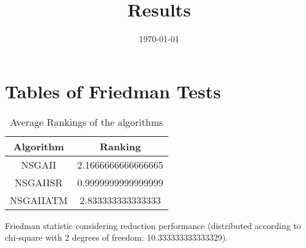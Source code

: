 \documentclass{article}
\title{Results}
\author{}
\date{\today}
\begin{document}
\oddsidemargin 0in \topmargin 0in\maketitle
\section{Tables of Friedman Tests}
\begin{table}[!htp]
\centering
\caption{Average Rankings of the algorithms
}\begin{tabular}{c|c}
Algorithm&Ranking\\
\hline
NSGAII&2.1666666666666665\\
NSGAIISR&0.9999999999999999\\
NSGAIIATM&2.833333333333333\\
\end{tabular}
\end{table}


Friedman statistic considering reduction performance (distributed according to chi-square with 2 degrees of freedom: 10.333333333333329).
\end{document}
